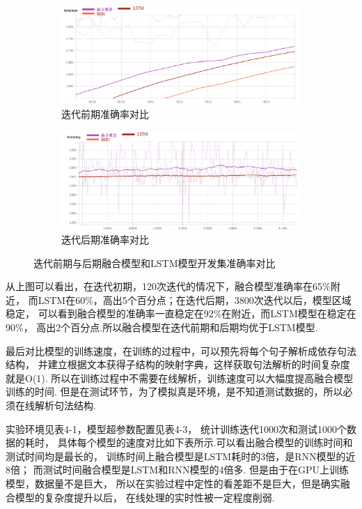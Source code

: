 \documentclass[bachelor,adobefonts]{jnuthesis}
\begin{document}
\begin{figure}[h!]
  \centering
  \begin{subfigure}[b]{0.8\linewidth}
    \includegraphics[width=\linewidth]{基本-准确率初期.png}
    \caption{迭代前期准确率对比}
  \end{subfigure}
  \begin{subfigure}[b]{0.8\linewidth}
    \includegraphics[width=\linewidth]{基本-准确率后期.png}
    \caption{迭代后期准确率对比}
  \end{subfigure}
  \caption{迭代前期与后期融合模型和LSTM模型开发集准确率对比}
\end{figure}

从上图可以看出，在迭代初期，120次迭代的情况下，融合模型准确率在65\%附近，
而LSTM在60\%，高出5个百分点；在迭代后期，3800次迭代以后，模型区域稳定，
可以看到融合模型的准确率一直稳定在92\%在附近，而LSTM模型在稳定在90\%，
高出2个百分点.所以融合模型在迭代前期和后期均优于LSTM模型.

最后对比模型的训练速度，在训练的过程中，可以预先将每个句子解析成依存句法结构，
并建立根据文本获得子结构的映射字典，这样获取句法解析的时间复杂度就是O(1).
所以在训练过程中不需要在线解析，训练速度可以大幅度提高融合模型训练的时间.
但是在测试环节，为了模拟真是环境，是不知道测试数据的，所以必须在线解析句法结构.

实验环境见表4-1，模型超参数配置见表4-3，
统计训练迭代1000次和测试1000个数据的耗时，
具体每个模型的速度对比如下表所示.可以看出融合模型的训练时间和测试时间均是最长的，
训练时间上融合模型是LSTM耗时的3倍，是RNN模型的近8倍；
而测试时间融合模型是LSTM和RNN模型的4倍多.
但是由于在GPU上训练模型，数据量不是巨大，
所以在实验过程中定性的看差距不是巨大，但是确实融合模型的复杂度提升以后，
在线处理的实时性被一定程度削弱.
\end{document}
